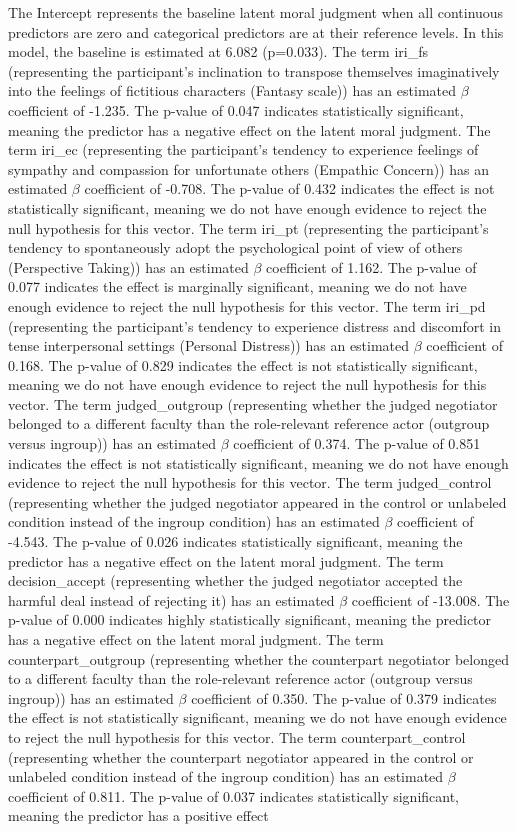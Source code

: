 \documentclass[11pt]{article}
\begin{document}
The Intercept represents the baseline latent moral judgment when all continuous predictors are zero and categorical predictors are at their reference levels. In this model, the baseline is estimated at 6.082 (p=0.033). The term iri\_fs (representing the participant's inclination to transpose themselves imaginatively into the feelings of fictitious characters (Fantasy scale)) has an estimated $\beta$ coefficient of -1.235. The p-value of 0.047 indicates statistically significant, meaning the predictor has a negative effect on the latent moral judgment. The term iri\_ec (representing the participant's tendency to experience feelings of sympathy and compassion for unfortunate others (Empathic Concern)) has an estimated $\beta$ coefficient of -0.708. The p-value of 0.432 indicates the effect is not statistically significant, meaning we do not have enough evidence to reject the null hypothesis for this vector. The term iri\_pt (representing the participant's tendency to spontaneously adopt the psychological point of view of others (Perspective Taking)) has an estimated $\beta$ coefficient of 1.162. The p-value of 0.077 indicates the effect is marginally significant, meaning we do not have enough evidence to reject the null hypothesis for this vector. The term iri\_pd (representing the participant's tendency to experience distress and discomfort in tense interpersonal settings (Personal Distress)) has an estimated $\beta$ coefficient of 0.168. The p-value of 0.829 indicates the effect is not statistically significant, meaning we do not have enough evidence to reject the null hypothesis for this vector. The term judged\_outgroup (representing whether the judged negotiator belonged to a different faculty than the role-relevant reference actor (outgroup versus ingroup)) has an estimated $\beta$ coefficient of 0.374. The p-value of 0.851 indicates the effect is not statistically significant, meaning we do not have enough evidence to reject the null hypothesis for this vector. The term judged\_control (representing whether the judged negotiator appeared in the control or unlabeled condition instead of the ingroup condition) has an estimated $\beta$ coefficient of -4.543. The p-value of 0.026 indicates statistically significant, meaning the predictor has a negative effect on the latent moral judgment. The term decision\_accept (representing whether the judged negotiator accepted the harmful deal instead of rejecting it) has an estimated $\beta$ coefficient of -13.008. The p-value of 0.000 indicates highly statistically significant, meaning the predictor has a negative effect on the latent moral judgment. The term counterpart\_outgroup (representing whether the counterpart negotiator belonged to a different faculty than the role-relevant reference actor (outgroup versus ingroup)) has an estimated $\beta$ coefficient of 0.350. The p-value of 0.379 indicates the effect is not statistically significant, meaning we do not have enough evidence to reject the null hypothesis for this vector. The term counterpart\_control (representing whether the counterpart negotiator appeared in the control or unlabeled condition instead of the ingroup condition) has an estimated $\beta$ coefficient of 0.811. The p-value of 0.037 indicates statistically significant, meaning the predictor has a positive effect 
\end{document}
